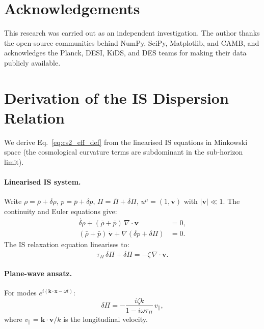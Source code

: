 \documentclass[12pt,a4paper]{article}
\newcommand{\tauPi}{\tau_\Pi}
\begin{document}
\section*{Acknowledgements}

This research was carried out as an independent investigation.
The author thanks the open-source communities behind NumPy, SciPy, Matplotlib,
and CAMB, and acknowledges the Planck, DESI, KiDS, and DES teams for
making their data publicly available.

\appendix

\section{Derivation of the IS Dispersion Relation}
\label{app:dispersion}

We derive Eq.~\eqref{eq:cs2_eff_def} from the linearised IS equations in Minkowski
space (the cosmological curvature terms are subdominant in the sub-horizon limit).

\paragraph{Linearised IS system.}
Write $\rho = \bar\rho + \delta\rho$, $p = \bar p + \delta p$, $\Pi = \bar\Pi + \delta\Pi$,
$u^\mu = (1,\mathbf{v})$ with $|\mathbf{v}| \ll 1$.
The continuity and Euler equations give:
\begin{align}
  \dot{\delta\rho} + (\bar\rho+\bar p)\,\nabla\cdot\mathbf{v} &= 0, \\
  (\bar\rho+\bar p)\,\dot{\mathbf{v}} + \nabla(\delta p + \delta\Pi) &= 0.
\end{align}
The IS relaxation equation linearises to:
\begin{equation}
  \tauPi\,\dot{\delta\Pi} + \delta\Pi = -\zeta\,\nabla\cdot\mathbf{v}.
\end{equation}

\paragraph{Plane-wave ansatz.}
For modes $e^{i(\mathbf{k}\cdot\mathbf{x} - \omega t)}$:
\begin{equation}
  \delta\Pi = -\frac{i\zeta k}{1-i\omega\tauPi}\,v_\parallel,
\end{equation}
where $v_\parallel = \mathbf{k}\cdot\mathbf{v}/k$ is the longitudinal velocity.
\end{document}
